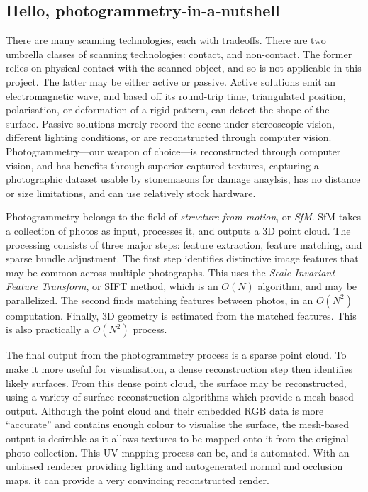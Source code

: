 \documentclass{article}
\begin{document}
\subsection{Hello, photogrammetry-in-a-nutshell}
There are many scanning technologies, each with tradeoffs. There are two umbrella classes of scanning technologies: contact, and non-contact. The former relies on physical contact with the scanned object, and so is not applicable in this project. The latter may be either active or passive. Active solutions emit an electromagnetic wave, and based off its round-trip time, triangulated position, polarisation, or deformation of a rigid pattern, can detect the shape of the surface. Passive solutions merely record the scene under stereoscopic vision, different lighting conditions, or are reconstructed through computer vision. Photogrammetry---our weapon of choice---is reconstructed through computer vision, and has benefits through superior captured textures, capturing a photographic dataset usable by stonemasons for damage anaylsis, has no distance or size limitations, and can use relatively stock hardware.

Photogrammetry belongs to the field of \emph{structure from motion}, or \emph{SfM}. SfM takes a collection of photos as input, processes it, and outputs a 3D point cloud. The processing consists of three major steps: feature extraction, feature matching, and sparse bundle adjustment.  The first step identifies distinctive image features that may be common across multiple photographs. This uses the \emph{Scale-Invariant Feature Transform}, or SIFT method, which is an $O(N)$ algorithm, and may be parallelized. The second finds matching features between photos, in an $O(N^2)$ computation. Finally, 3D geometry is estimated from the matched features. This is also practically a $O(N^2)$ process. 

The final output from the photogrammetry process is a sparse point cloud. To make it more useful for visualisation, a dense reconstruction step then identifies likely surfaces. From this dense point cloud, the surface may be reconstructed, using a variety of surface reconstruction algorithms which provide a mesh-based output. Although the point cloud and their embedded RGB data is more ``accurate'' and contains enough colour to visualise the surface, the mesh-based output is desirable as it allows textures to be mapped onto it from the original photo collection. This UV-mapping process can be, and is automated. With an unbiased renderer providing lighting and autogenerated normal and occlusion maps, it can provide a very convincing reconstructed render.
\end{document}
